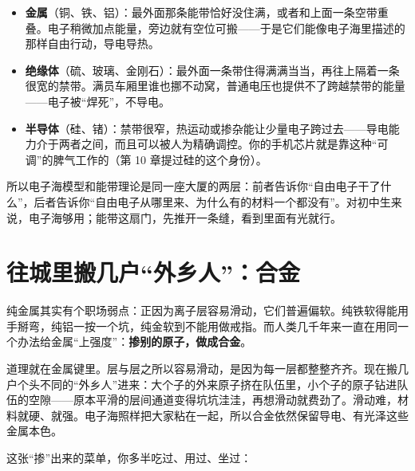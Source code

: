 \begin{itemize}[itemsep=2pt]
\item \textbf{金属}（铜、铁、铝）：最外面那条能带恰好没住满，或者和上面一条空带重叠。电子稍微加点能量，旁边就有空位可搬——于是它们能像电子海里描述的那样自由行动，导电导热。
\item \textbf{绝缘体}（硫、玻璃、金刚石）：最外面一条带住得满满当当，再往上隔着一条很宽的禁带。满员车厢里谁也挪不动窝，普通电压也提供不了跨越禁带的能量——电子被“焊死”，不导电。
\item \textbf{半导体}（硅、锗）：禁带很窄，热运动或掺杂能让少量电子跨过去——导电能力介于两者之间，而且可以被人为精确调控。你的手机芯片就是靠这种“可调”的脾气工作的（第 10 章提过硅的这个身份）。
\end{itemize}

所以电子海模型和能带理论是同一座大厦的两层：前者告诉你“自由电子干了什么”，后者告诉你“自由电子从哪里来、为什么有的材料一个都没有”。对初中生来说，电子海够用；能带这扇门，先推开一条缝，看到里面有光就行。

\section{往城里搬几户“外乡人”：合金}

纯金属其实有个职场弱点：正因为离子层容易滑动，它们普遍偏软。纯铁软得能用手掰弯，纯铝一按一个坑，纯金软到不能用做戒指。而人类几千年来一直在用同一个办法给金属“上强度”：\textbf{掺别的原子，做成合金}。

道理就在金属键里。层与层之所以容易滑动，是因为每一层都整整齐齐。现在搬几户个头不同的“外乡人”进来：大个子的外来原子挤在队伍里，小个子的原子钻进队伍的空隙——原本平滑的层间通道变得坑坑洼洼，再想滑动就费劲了。滑动难，材料就硬、就强。电子海照样把大家粘在一起，所以合金依然保留导电、有光泽这些金属本色。

这张“掺”出来的菜单，你多半吃过、用过、坐过：

